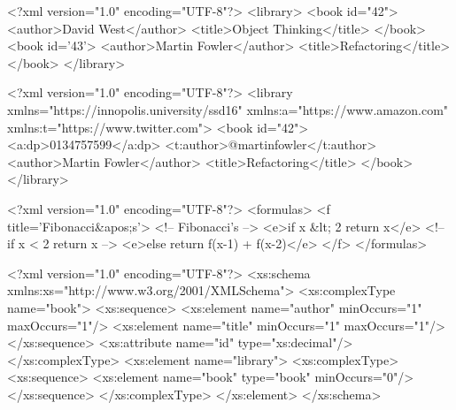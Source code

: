 \documentclass{article}
\begin{document}

\pptToc


\begin{lnSnippet}
<?xml version="1.0" encoding="UTF-8"?>
<library>
  <book id="42">
    <author>David West</author>
    <title>Object Thinking</title>
  </book>
  <book id='43'>
    <author>Martin Fowler</author>
    <title>Refactoring</title>
  </book>
</library>
\end{lnSnippet}

\begin{lnSnippet}
<?xml version="1.0" encoding="UTF-8"?>
<library xmlns="https://innopolis.university/ssd16"
  xmlns:a="https://www.amazon.com"
  xmlns:t="https://www.twitter.com">
  <book id="42">
    <a:dp>0134757599</a:dp>
    <t:author>@martinfowler</t:author>
    <author>Martin Fowler</author>
    <title>Refactoring</title>
  </book>
</library>
\end{lnSnippet}

\begin{lnSnippet}
<?xml version="1.0" encoding="UTF-8"?>
<formulas>
  <f title='Fibonacci&apos;s'> <!-- Fibonacci's -->
    <e>if x &lt; 2 return x</e> <!-- if x < 2 return x -->
    <e>else return f(x-1) + f(x-2)</e>
  </f>
</formulas>
\end{lnSnippet}



\begin{lnSnippet}
<?xml version="1.0" encoding="UTF-8"?>
<xs:schema xmlns:xs="http://www.w3.org/2001/XMLSchema">
  <xs:complexType name="book">
    <xs:sequence>
      <xs:element name="author" minOccurs="1" maxOccurs="1"/>
      <xs:element name="title" minOccurs="1" maxOccurs="1"/>
    </xs:sequence>
    <xs:attribute name="id" type="xs:decimal"/>
  </xs:complexType>
  <xs:element name="library">
    <xs:complexType>
      <xs:sequence>
        <xs:element name="book" type="book" minOccurs="0"/>
      </xs:sequence>
    </xs:complexType>
  </xs:element>
</xs:schema>
\end{lnSnippet}
\end{document}
